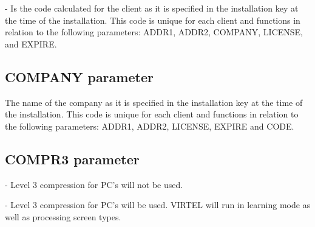 \documentclass[letterpaper,10pt,english]{sphinxmanual}
\begin{document}
 - Is the code calculated for the client as it is specified in the installation key at the time of the installation. This code
is unique for each client and functions in relation to the following parameters: ADDR1, ADDR2, COMPANY, LICENSE, and EXPIRE.

\ignorespaces 

\subsection{COMPANY parameter}
\label{\detokenize{Installation_Guide:company-parameter}}\label{\detokenize{Installation_Guide:index-45}}
\begin{sphinxVerbatim}[commandchars=\\\{\}]
 
\end{sphinxVerbatim}

The name of the company as it is specified in the installation key at the time of the installation. This code is unique for
each client and functions in relation to the following parameters: ADDR1, ADDR2, LICENSE, EXPIRE and CODE.

\ignorespaces 

\subsection{COMPR3 parameter}
\label{\detokenize{Installation_Guide:compr3-parameter}}\label{\detokenize{Installation_Guide:index-46}}
\begin{sphinxVerbatim}[commandchars=\\\{\}]
 
\end{sphinxVerbatim}

 - Level 3 compression for PC’s will not be used.

 - Level 3 compression for PC’s will be used. VIRTEL will run in learning mode as well as processing screen types.
\end{document}
